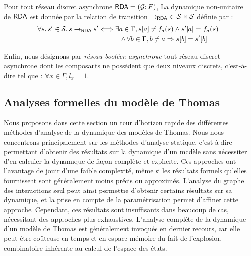 \begin{definition}
  Pour tout réseau discret asynchrone $\mathsf{RDA} = (\mathcal{G}; F)$,
  La dynamique non-unitaire de $\mathsf{RDA}$ est donnée par la relation de transition
  $\rightarrow_{\mathsf{RDA}}\ \in \mathcal{S} \times \mathcal{S}$ définie par :
  \begin{align*}
    \forall s, s' \in \mathcal{S}, s \rightarrow_{\mathsf{RDA}} s'
      &\Longleftrightarrow \exists a \in \Gamma,
    {s[a]} \neq f_a(s) \wedge
      {s'[a]} = f_a(s) \\
      &\qquad\quad \wedge \forall b \in \Gamma, b \neq a \Rightarrow {s[b]} = {s'[b]}
  \end{align*}
\end{definition}

Enfin, nous désignons par \emph{réseau booléen asynchrone}
tout réseau discret asynchrone dont les composants ne possèdent que deux niveaux discrets,
c'est-à-dire tel que : $\forall x \in \Gamma, l_x = 1$.



\subsection{Analyses formelles du modèle de Thomas}

Nous proposons dans cette section un tour d'horizon rapide des différentes méthodes
d'analyse de la dynamique des modèles de Thomas.
Nous nous concentrons principalement sur les méthodes d'analyse statique,
c'est-à-dire permettant d'obtenir des résultats sur la dynamique d'un modèle
sans nécessiter d'en calculer la dynamique de façon complète et explicite.
Ces approches ont l'avantage de jouir d'une faible complexité, même si les résultats formels
qu'elles fournissent sont généralement moins précis ou approximés.
L'analyse du graphe des interactions seul peut ainsi permettre d'obtenir certains
résultats sur sa dynamique,
et la prise en compte de la paramétrisation permet d'affiner cette approche.
Cependant, ces résultats sont insuffisants dans beaucoup de cas,
nécessitant des approches plus exhaustives.
L'analyse complète de la dynamique d'un modèle de Thomas
est généralement invoquée en dernier recours, car elle peut être coûteuse en temps
et en espace mémoire du fait de l'explosion combinatoire inhérente au calcul
de l'espace des états.

